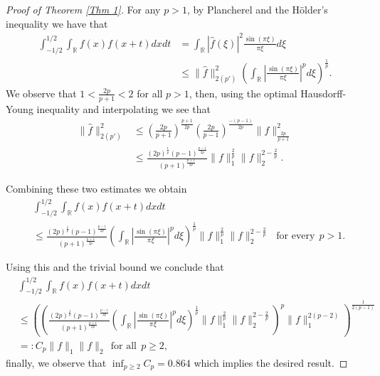 \documentclass[11pt, reqno]{amsart}
\numberwithin{equation}{section}
\newcommand{\R}{{\mathbb R}}
\begin{document}
\begin{proof}[Proof of Theorem \ref{Thm 1}]
For any $p> 1$, by Plancherel and the H\"older's inequality we have that
\begin{align*}
    \int_{-1/2}^{1/2}\int_{\R}f(x)f(x+t) dx dt&=\int_{\R}|\hat f(\xi)|^{2}\frac{\sin(\pi\xi)}{\pi\xi} d\xi\\
    &\leq \|\hat f\|^{2}_{2(p')}\left(\int_{\R}\left|\frac{\sin(\pi\xi)}{\pi\xi}\right|^{p}d\xi\right)^{\frac{1}{p}}.
\end{align*}
We observe that $1<\frac{2p}{p+1}<2$ for all $p>1$, then, using the optimal Hausdorff-Young inequality \cite{Beckner} and interpolating we see that
\begin{align*}
\|\hat f\|^{2}_{2(p')} &\leq \left(\frac{2p}{p+1}\right)^{\frac{p+1}{2p}}\left(\frac{2p}{p-1}\right)^{\frac{-(p-1)}{2p}}\|f\|^2_{\frac{2p}{p+1}}   \\
&\leq \frac{(2p)^{\frac{1}{p}}(p-1)^{\frac{p-1}{2p}}}{(p+1)^{\frac{p+1}{2p}}}\|f\|^{\frac{2}{p}}_1\|f\|^{2-\frac{2}{p}}_2.
\end{align*}

Combining these two estimates we obtain
\begin{align}
    &\int_{-1/2}^{1/2}\int_{\R}f(x)f(x+t) dx dt\nonumber\\
    &\leq \frac{(2p)^{\frac{1}{p}}(p-1)^{\frac{p-1}{2p}}}{(p+1)^{\frac{p+1}{2p}}}\left(\int_{\R}\left|\frac{\sin(\pi\xi)}{\pi\xi}\right|^{p}d\xi\right)^{\frac{1}{p}}\|f\|^{\frac{2}{p}}_1\|f\|^{2-\frac{2}{p}}_2\ \ \ \text{for every}\ \ p>1. \label{HY consequence}
    \end{align}

Using this and the trivial bound we conclude that
\begin{align*}
    &\int_{-1/2}^{1/2}\int_{\R}f(x)f(x+t) dx dt\\
    &\leq 
    \left(
    \left( \frac{(2p)^{\frac{1}{p}}(p-1)^{\frac{p-1}{2p}}}{(p+1)^{\frac{p+1}{2p}}}\left(\int_{\R}\left|\frac{\sin(\pi\xi)}{\pi\xi}\right|^{p}d\xi\right)^{\frac{1}{p}}\|f\|^{\frac{2}{p}}_1\|f\|^{2-\frac{2}{p}}_2  
    \right)^{p}\|f\|^{2(p-2)}_1 \right)^{\frac{1}{2(p-1)}}\\
    &=: C_p\|f\|_1\|f\|_2 \ \ \text{for all}\ \ p\geq2,
    \end{align*}
finally, we observe that $\inf_{p\geq 2} C_p=0.864$ which implies the desired result.
\end{proof}
\end{document}
